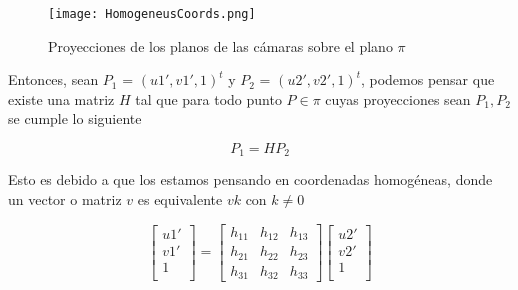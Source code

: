 \documentclass{article}
\begin{document}
\begin{figure}[h]
    \centering
    \texttt{[image: HomogeneusCoords.png]}
    \caption{Proyecciones de los planos de las cámaras sobre el plano $\pi$}
    \label{fig:homogeneus-coords}
\end{figure}

Entonces, sean $P_1$ = $(u1',v1',1)^t$ y $P_2$ = $(u2',v2',1)^t$, podemos pensar que existe una matriz $H$ tal que
para todo punto $P\in \pi$ cuyas proyecciones sean $P_1,P_2$ se cumple lo siguiente
\begin{figure}[h]
    \centering
    \begin{equation}
        P_1 = HP_2
    \end{equation}
    \label{fig:Hmatrix}
\end{figure}

Esto es debido a que los estamos pensando en coordenadas homogéneas, donde un vector o matriz $v$ es equivalente $v k$ con $k \neq 0$ 
\begin{figure}[h]
    \centering
    \begin{equation}
        \begin{bmatrix}
            u1' \\
            v1' \\
            1   \\
        \end{bmatrix}
        =
        \begin{bmatrix}
            h_{11} & h_{12} & h_{13} \\
            h_{21} & h_{22} & h_{23} \\
            h_{31} & h_{32} & h_{33} 
        \end{bmatrix}
        \begin{bmatrix}
            u2' \\
            v2' \\
            1   \\
        \end{bmatrix}
    \end{equation}
    \label{fig:H-bmatrix}
\end{figure}
\end{document}
